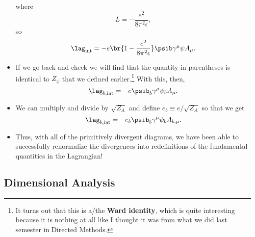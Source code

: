 \begin{itemize}
\begin{equation}
        \end{equation}
        where 
        \begin{equation}
            L = -\frac{e^2}{8\pi^2\epsilon},
        \end{equation}
        so
        \begin{equation}
            \lag_{\mathrm{int}} = -e\br{1 - \frac{e^2}{8\pi^2\epsilon}} \psib\gamma^{\mu}\psi A_{\mu}.
        \end{equation}
    \item If we go back and check we will find that the quantity in parentheses is identical to $Z_{\psi}$ that we defined earlier.\footnote{It turns out that this is a/the \textbf{Ward identity}, which is quite interesting because it is nothing at all like I thought it was from what we did last semester in Directed Methods.} With this, then,
        \begin{equation}
            \lag_{b,\mathrm{int}} = -e\psib_b \gamma^{\mu} \psi_b A_{\mu}.
        \end{equation}
    \item We can multiply and divide by $\sqrt{Z_A}$ and define $e_b \equiv e/\sqrt{Z_A}$ so that we get
        \begin{equation}
            \lag_{b,\mathrm{int}} = -e_b\psib_b\gamma^{\mu}\psi_b A_{b,\mu}.
        \end{equation}
    \item Thus, with all of the primitively divergent diagrams, we have been able to successfully renormalize the divergences into redefinitions of the fundamental quantities in the Lagrangian!
\end{itemize}




\subsection*{Dimensional Analysis}

